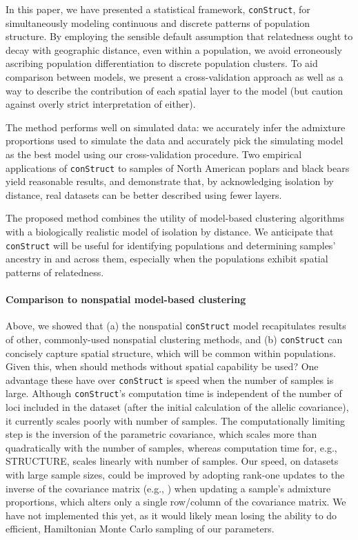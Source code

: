 \documentclass[10pt,letterpaper]{article}
\begin{document}
In this paper, we have presented a statistical framework, \texttt{conStruct}, for simultaneously 
modeling continuous and discrete patterns of population structure.
By employing the sensible default assumption
that relatedness ought to decay with geographic distance, even within a population, 
we avoid erroneously ascribing population differentiation to discrete population clusters.
To aid comparison between models,
we present a cross-validation approach 
as well as a way to describe the contribution of each spatial layer to the model
(but caution against overly strict interpretation of either).

The method performs well on simulated data:
we accurately infer the admixture proportions used to simulate the data 
and accurately pick the simulating model as the best model using our cross-validation procedure.
Two empirical applications of \texttt{conStruct} to samples of North American poplars and black bears
yield reasonable results,
and demonstrate that,
by acknowledging isolation by distance,
real datasets can be better described using fewer layers.

The proposed method combines the utility of model-based clustering algorithms 
with a biologically realistic model of isolation by distance.
We anticipate that \texttt{conStruct} will be useful for identifying populations 
and determining samples' ancestry in and across them, 
especially when the populations exhibit spatial patterns of relatedness.

\paragraph{Comparison to nonspatial model-based clustering}
Above, we showed that 
(a) the nonspatial \texttt{conStruct} model recapitulates results of 
other, commonly-used nonspatial clustering methods,
and 
(b) \texttt{conStruct} can concisely capture spatial structure, which
will be common within populations.
Given this, when should methods without spatial capability be used?
One advantage these have over \texttt{conStruct} is speed when the number of samples is large.
Although \texttt{conStruct}'s computation time is independent
of the number of loci included in the dataset 
(after the initial calculation of the allelic covariance), 
it currently scales poorly with number of samples.
The computationally limiting step is the inversion of the parametric covariance, 
which scales more than quadratically with the number of samples,
whereas computation time for, e.g., STRUCTURE, 
scales linearly with number of samples.
Our speed, on datasets with large sample sizes, 
could be improved by adopting rank-one updates 
to the inverse of the covariance matrix 
(e.g., \cite{woodbury1950,sherman_morrison1950})
when updating a sample's admixture proportions, 
which alters only a single row/column of the covariance matrix. 
We have not implemented this yet, 
as it would likely mean losing the ability to do efficient,  
Hamiltonian Monte Carlo sampling of our parameters.
\end{document}
